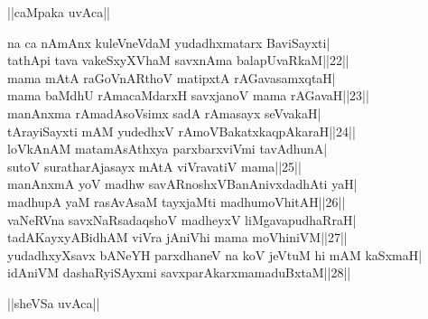 \documentclass{article}
\begin{document}
\begin{center}
||caMpaka uvAca||
\end{center}

na ca nAmAnx kuleVneVdaM yudadhxmatarx BaviSayxti|\\
tathApi tava vakeSxyXVhaM savxnAma balapUvaRkaM||22||\\
mama mAtA raGoVnARthoV matipxtA rAGavasamxqtaH|\\
mama baMdhU rAmacaMdarxH savxjanoV mama rAGavaH||23||\\
manAnxma rAmadAsoVsimx sadA rAmasayx seVvakaH|\\
tArayiSayxti mAM yudedhxV rAmoVBakatxkaqpAkaraH||24||\\
loVkAnAM matamAsAthxya parxbarxviVmi tavAdhunA|\\
sutoV suratharAjasayx mAtA viVravatiV mama||25||\\
manAnxmA yoV madhw savARnoshxVBanAnivxdadhAti yaH|\\
madhupA yaM rasAvAsaM tayxjaMti madhumoVhitAH||26||\\
vaNeRVna savxNaRsadaqshoV madheyxV liMgavapudhaRraH|\\
tadAKayxyABidhAM viVra jAniVhi mama moVhiniVM||27||\\
yudadhxyXsavx bANeYH parxdhaneV na koV jeVtuM hi mAM kaSxmaH|\\
idAniVM dashaRyiSAyxmi savxparAkarxmamaduBxtaM||28||\\

\begin{center}
||sheVSa uvAca||
\end{center}
\end{document}
